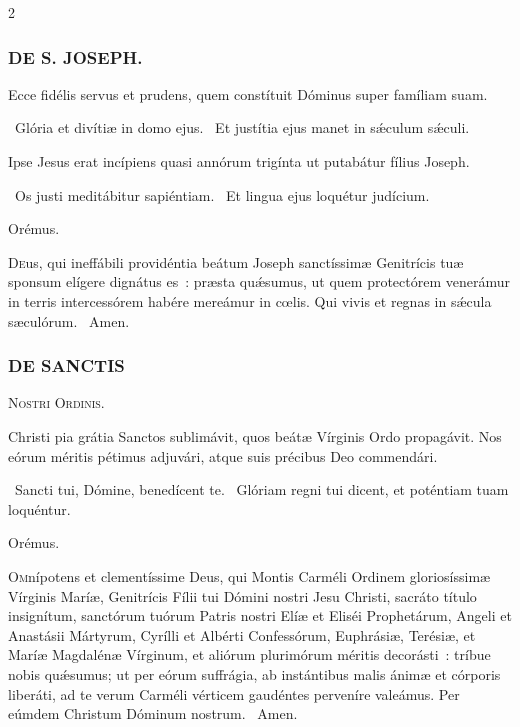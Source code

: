 \documentclass[9pt,twoside]{extarticle}
\begin{document}
\begin{multicols}{2}
{\subsubsection*{\center \textsc{DE S. JOSEPH.}}
\begin{tightlist}{}
\item {}
\item {} Ecce fidélis servus et prudens, quem constítuit Dóminus super famíliam suam.
\item {}~Glória et divítiæ in domo ejus. ~Et justítia ejus manet in sǽculum sǽculi.
\item {} Ipse Jesus erat incípiens quasi annórum trigínta ut putabátur fílius Joseph.
\item {}~Os justi meditábitur sapiéntiam. ~Et lingua ejus loquétur judícium.
\item Orémus. \hfill {}
\end{tightlist}
\lettrine{D}eus, qui ineffábili providéntia beátum Joseph sanctíssimæ Genitrícis tuæ sponsum elígere dignátus es~: præsta quǽsumus, ut quem protectórem venerámur in terris intercessórem habére mereámur in cœlis. Qui vivis et regnas in sǽcula sæculórum. ~Amen.

\subsubsection*{\center \textsc{DE SANCTIS}}
\begin{center}\textsc{Nostri Ordinis.}\end{center}
\begin{tightlist}{}
\item {} Christi pia grátia Sanctos sublimávit, quos beátæ Vírginis Ordo propagávit. Nos eórum méritis pétimus adjuvári, atque suis précibus Deo commendári.
\item {}~Sancti tui, Dómine, benedícent te. ~Glóriam regni tui dicent, et poténtiam tuam loquéntur.
\item Orémus. \hfill {}
\end{tightlist}
\lettrine{O}mnípotens et clementíssime Deus, qui Montis Carméli Ordinem gloriosíssimæ Vírginis Maríæ, Genitrícis Fílii tui Dómini nostri Jesu Christi, sacráto título insignítum, sanctórum tuórum Patris nostri Elíæ et Eliséi Prophetárum, Angeli et Anastásii Mártyrum, Cyrílli et Albérti Confessórum, Euphrásiæ, Terésiæ, et Maríæ Magdalénæ Vírginum, et aliórum plurimórum méritis decorásti~: tríbue nobis quǽsumus; ut per eórum suffrágia, ab instántibus malis ánimæ et córporis liberáti, ad te verum Carméli vérticem gaudéntes perveníre valeámus. Per eúmdem Christum Dóminum nostrum. ~Amen.

}
\end{multicols}
\end{document}
